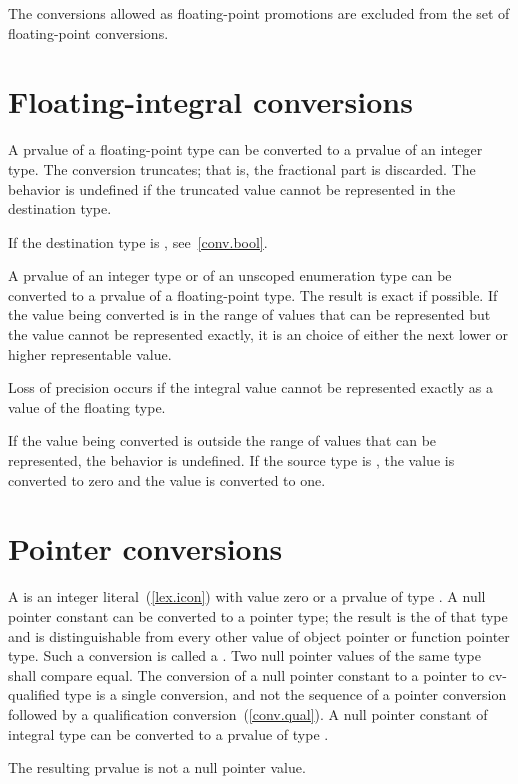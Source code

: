 \pnum
The conversions allowed as floating-point promotions are excluded from
the set of floating-point conversions.

\section[conv.fpint]{Floating-integral conversions}

\pnum
{}%
A prvalue of a floating-point type can be converted to a prvalue of an
integer type. The conversion truncates; that is, the fractional part is
discarded.
%
The behavior is undefined if the truncated value cannot be represented
in the destination type.
\begin{note}
If the destination type is , see~\ref{conv.bool}.
\end{note}

\pnum
{}%
%
%
A prvalue of an integer type or of an unscoped enumeration type can be converted to
a prvalue of a floating-point type. The result is exact if possible. If the value being
converted is in the range of values that can be represented but the value cannot be
represented exactly, it is an  choice of either the next lower or higher representable
value. \begin{note} Loss of precision occurs if the integral value cannot be represented
exactly as a value of the floating type. \end{note} If the value being converted is
outside the range of values that can be represented, the behavior is undefined. If the
source type is , the value  is converted to zero and the value
 is converted to one.

\section[conv.ptr]{Pointer conversions}

\pnum
{}%
%
%
%
A  is an integer literal~(\ref{lex.icon}) with
value zero
or a prvalue of type . A null pointer constant can be
converted to a pointer type; the
result is the  of that type and is
distinguishable from every other value of
object pointer or function pointer
type.
Such a conversion is called a .
Two null pointer values of the same type shall compare
equal. The conversion of a null pointer constant to a pointer to
cv-qualified type is a single conversion, and not the sequence of a
pointer conversion followed by a qualification
conversion~(\ref{conv.qual}). A null pointer constant of integral type
can be converted to a prvalue of type .
\begin{note} The resulting prvalue is not a null pointer value. \end{note}

